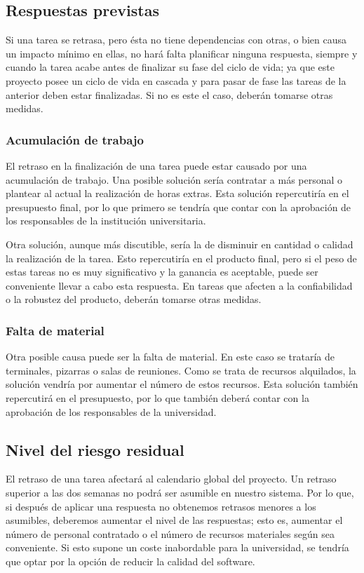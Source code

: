 \documentclass[11pt,a4paper,spanish,twoside]{book}
\begin{document}
\subsection{Respuestas previstas}
Si una tarea se retrasa, pero ésta no tiene dependencias con otras, o bien
causa un impacto mínimo en ellas, no hará falta planificar ninguna respuesta,
siempre y cuando la tarea acabe antes de finalizar su fase del ciclo de vida;
ya que este proyecto posee un ciclo de vida en cascada y para pasar de fase
las tareas de la anterior deben estar finalizadas. Si no es este el caso,
deberán tomarse otras medidas.

\subsubsection{Acumulación de trabajo}
El retraso en la finalización de una tarea puede estar causado por una
acumulación de trabajo. Una posible solución sería contratar a más
personal o plantear al actual la realización de horas extras. Esta
solución repercutiría en el presupuesto final, por lo que primero se tendría
que contar con la aprobación de los responsables de la institución
universitaria.

Otra solución, aunque más discutible, sería la de disminuir en cantidad o
calidad la realización de la tarea. Esto repercutiría en el producto final,
pero si el peso de estas tareas no es muy significativo y la ganancia es
aceptable, puede ser conveniente llevar a cabo esta respuesta. En tareas que
afecten a la confiabilidad o la robustez del producto, deberán tomarse otras
medidas.

\subsubsection{Falta de material}
Otra posible causa puede ser la falta de material. En este caso se
trataría de 
terminales, pizarras o salas de reuniones. Como se trata de recursos
alquilados, la solución vendría por aumentar el número de estos recursos.
Esta solución también repercutirá en el presupuesto, por lo que también
deberá contar con la aprobación de los responsables de la universidad.

\subsection{Nivel del riesgo residual}
El retraso de una tarea afectará al calendario global del proyecto. Un retraso
superior a las dos semanas no podrá ser asumible en nuestro sistema. Por lo
que, si después de aplicar una respuesta no obtenemos retrasos menores a los
asumibles, deberemos aumentar el nivel de las respuestas; esto es, aumentar
el número de personal contratado o el número de recursos materiales según sea
conveniente. Si esto supone un coste inabordable para la universidad, se
tendría que optar por la opción de reducir la calidad del software.
\end{document}
